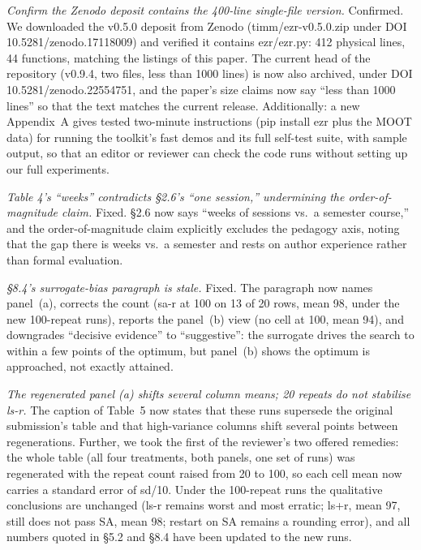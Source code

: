 \documentclass[11pt]{article}
\begin{document}
\smallskip{} {\em Confirm the Zenodo deposit contains the
400-line single-file version.} Confirmed. We downloaded the
\textsf{v0.5.0} deposit from Zenodo
(\textsf{timm/ezr-v0.5.0.zip} under DOI
\textsf{10.5281/zenodo.17118009}) and verified it contains
\textsf{ezr/ezr.py}: 412 physical lines, 44 functions, matching
the listings of this paper. The current head of the repository
(\textsf{v0.9.4}, two files, less than 1000 lines) is now also
archived, under DOI \textsf{10.5281/zenodo.22554751}, and the
paper's size claims now say ``less than 1000 lines'' so that the
text matches the current release. Additionally: a new Appendix~A gives tested
two-minute instructions (\textsf{pip install ezr} plus the MOOT
data) for running the toolkit's fast demos and its full self-test
suite, with sample output, so that an editor or reviewer can
check the code runs without setting up our full experiments.

\smallskip{} {\em Table 4's ``weeks'' contradicts \S2.6's
``one session,'' undermining the order-of-magnitude claim.}
Fixed. \S2.6 now says ``weeks of sessions vs.\ a
semester course,'' and the order-of-magnitude claim explicitly
excludes the pedagogy axis, noting that the gap there is weeks
vs.\ a semester and rests on author experience rather than
formal evaluation.

\smallskip{} {\em \S8.4's surrogate-bias paragraph is
stale.} Fixed. The paragraph now names panel~(a), corrects the
count (\textsf{sa-r} at 100 on 13 of 20 rows, mean 98, under the
new 100-repeat runs), reports
the panel~(b) view (no cell at 100, mean 94), and downgrades
``decisive evidence'' to ``suggestive'': the surrogate drives
the search to within a few points of the optimum, but panel~(b)
shows the optimum is approached, not exactly attained.

\smallskip{} {\em The regenerated panel (a) shifts several
column means; 20 repeats do not stabilise \textsf{ls-r}.} The
caption of Table~5 now states that these runs
supersede the original submission's table and that high-variance
columns shift several points between regenerations. Further, we
took the first of the reviewer's two offered remedies: the whole
table (all four treatments, both panels, one set of runs) was
regenerated with the repeat count raised from 20 to 100, so each
cell mean now carries a standard error of sd/10. Under the
100-repeat runs the qualitative conclusions are unchanged
(\textsf{ls-r} remains worst and most erratic;
\textsf{ls+r}, mean 97, still does not pass SA, mean 98;
restart on SA remains a rounding error), and all numbers quoted
in \S5.2 and \S8.4 have been updated to the new runs.
\end{document}
